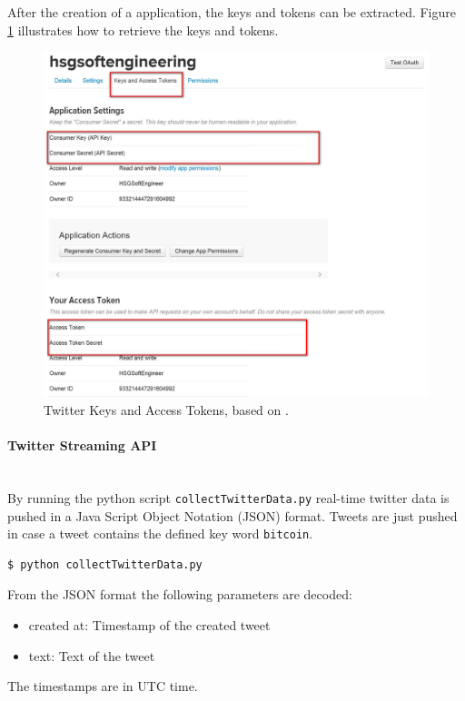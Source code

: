 \documentclass[a4paper,12pt]{article}
\begin{document}
\begin{spacing}{1.2}
After the creation of a application, the keys and tokens can be extracted. Figure \ref{Fig:Keys and Tokens} illustrates how to retrieve the keys and tokens.
\begin{figure}[h]
\centering
\includegraphics[scale=0.6]{twitteraccess}
\caption{Twitter Keys and Access Tokens, based on \cite{twitterinc2017c}.}
\label{Fig:Keys and Tokens}
\end{figure}

\paragraph{Twitter Streaming API}\mbox{}\\{}
By running the python script \verb|collectTwitterData.py| real-time twitter data is pushed in a Java Script Object Notation (JSON) format. Tweets are just pushed in case a tweet contains the defined key word \verb|bitcoin|.
\begin{lstlisting}[language=bash]
$ python collectTwitterData.py
\end{lstlisting}

From the JSON format the following parameters are decoded:
\begin{itemize}
    \item created at: Timestamp of the created tweet
    \item text: Text of the tweet
\end{itemize}
The timestamps are in UTC time.


\end{spacing}
\end{document}
